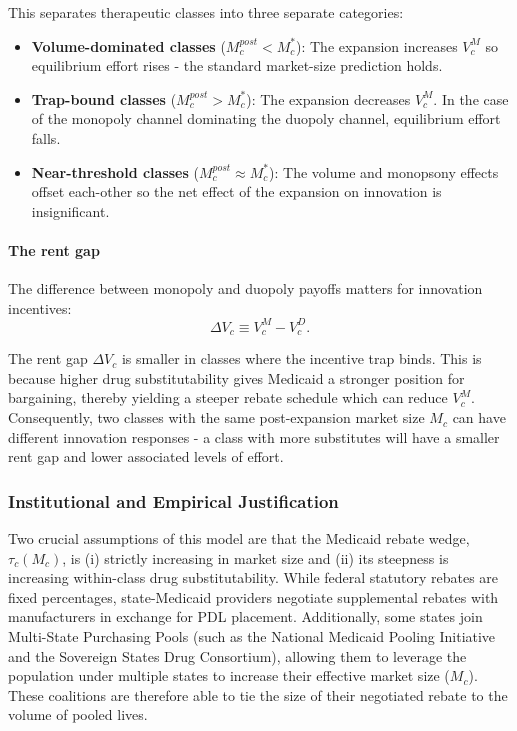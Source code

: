 \documentclass[12pt]{article}
\begin{document}
This separates therapeutic classes into three separate categories:

\begin{itemize}
    \item \textbf{Volume-dominated classes} ($M_c^{post} < M_c^*$): The expansion increases $V_c^M$ so equilibrium effort rises - the standard market-size prediction holds.

    \item \textbf{Trap-bound classes} ($M_c^{post} > M_c^*$): The expansion decreases $V_c^M$. In the case of the monopoly channel dominating the duopoly channel, equilibrium effort falls.

    \item \textbf{Near-threshold classes} ($M_c^{post} \approx M_c^*$): The volume and monopsony effects offset each-other so the net effect of the expansion on innovation is insignificant.
\end{itemize}

\paragraph{The rent gap}
The difference between monopoly and duopoly payoffs matters for innovation incentives:
\begin{equation}
    \Delta V_c \equiv V_c^M - V_c^D .
\end{equation}

The rent gap $\Delta V_c$ is smaller in classes where the incentive trap binds. This is because higher drug substitutability gives Medicaid a stronger position for bargaining, thereby yielding a steeper rebate schedule which can reduce $V_c^M$. Consequently, two classes with the same post-expansion market size $M_c$ can have different innovation responses - a class with more substitutes will have a smaller rent gap and lower associated levels of effort.

\subsubsection{Institutional and Empirical Justification}
Two crucial assumptions of this model are that the Medicaid rebate wedge, $\tau_c(M_c)$, is (i) strictly increasing in market size and (ii) its steepness is increasing within-class drug substitutability. While federal statutory rebates are fixed percentages, state-Medicaid providers negotiate supplemental rebates with manufacturers in exchange for PDL placement. Additionally, some states join Multi-State Purchasing Pools (such as the National Medicaid Pooling Initiative and the Sovereign States Drug Consortium), allowing them to leverage the population under multiple states to increase their effective market size ($M_c$). These coalitions are therefore able to tie the size of their negotiated rebate to the volume of pooled lives.
\end{document}
